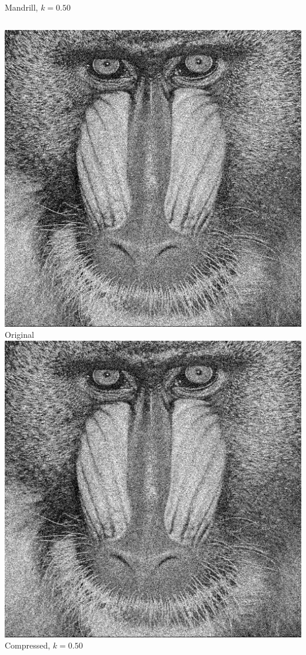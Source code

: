 \documentclass[12pt]{beamer}
\begin{document}
\begin{frame}{Mandrill, \(k=0.50\)}
  \begin{columns}
      \includegraphics[width=\textwidth]{Mandrill.jpg}\\
      \footnotesize Original
      \includegraphics[width=\textwidth]{Mandrill_k50.png}\\
      \footnotesize Compressed, \(k=0.50\)
  \end{columns}
\end{frame}
\end{document}
